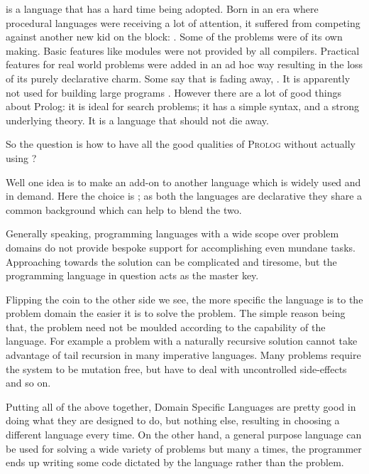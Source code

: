 \documentclass[thesis-solanki.tex]{subfiles}
\begin{document}
\par {} is a language that has a hard time being adopted. Born in an era where procedural languages were receiving a lot of 
attention, it suﬀered from competing against another new kid on the block: . Some of the problems were of its own making. Basic 
features like modules were not provided by all compilers. Practical features for real world problems were added in an ad hoc way resulting 
in the loss of its purely declarative charm. Some say that  is fading away, 
\cite{website:prolog-steam,website:prolog-death,website:prolog-killer}. It is apparently not used for building large programs 
\cite{wikiprolog,somogyi1995logic,website:prolog1000db}. However there are a lot of good things about Prolog: it is ideal for search 
problems; it has a simple syntax, and a strong underlying theory. It is a language that should not die away. 

\noindent So the question is how to have all the good qualities of \textsc{Prolog} without actually using ?  

\par Well one idea is to make  an add-on to another language which is widely used and in demand. Here the choice is 
; as both the languages are declarative they share a common background which can help to blend the two.

\par Generally speaking, programming languages with a wide scope over problem domains do not provide bespoke support for accomplishing even 
mundane tasks. Approaching towards the solution can be complicated and tiresome, but the programming language in question acts as the master key. 

\par Flipping the coin to the other side we see, the more specific the language is to the problem domain the easier it is to solve the 
problem. The simple reason being that, the problem need not be moulded according to the capability  of the language. For example a problem 
with a naturally recursive 
solution cannot take advantage of tail recursion in many imperative languages. Many problems require the system to be mutation free, but 
have to deal with uncontrolled side-effects and so on.  

\par Putting all of the above together, Domain Specific Languages are pretty good in doing what they are designed to do, but nothing else, resulting in 
choosing a different language every time. On the other hand, a general purpose language can be used for solving a wide variety of problems but many a 
times, the programmer ends up writing some code dictated by the language rather than the problem.  
\end{document}
